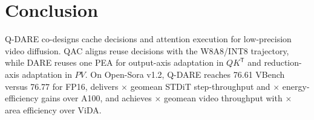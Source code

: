 \section{Conclusion}
\label{sec:conclusion}

Q-DARE co-designs cache decisions and attention execution for low-precision video diffusion. QAC aligns reuse decisions with the W8A8/INT8 trajectory, while DARE reuses one PEA for output-axis adaptation in $QK^{\mathsf T}$ and reduction-axis adaptation in $PV$. On Open-Sora v1.2, Q-DARE reaches 76.61 VBench versus 76.77 for FP16, delivers \QDAREStepGeoA$\times$ geomean STDiT step-throughput and \QDAREEnergyGeoA$\times$ energy-efficiency gains over A100, and achieves \QDAREViDAThroughputGeo$\times$ geomean video throughput with \QDAREViDAreaGeo$\times$ area efficiency over ViDA.
